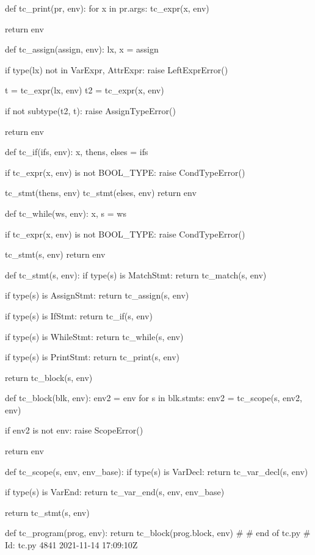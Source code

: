 \begin{dispPy}
def tc_print(pr, env):
    for x in pr.args:
        tc_expr(x, env)

    return env

def tc_assign(assign, env):
    lx, x = assign

    if type(lx) not in {VarExpr, AttrExpr}:
        raise LeftExprError()

    t = tc_expr(lx, env)
    t2 = tc_expr(x, env)

    if not subtype(t2, t):
        raise AssignTypeError()

    return env

def tc_if(ifs, env):
    x, thens, elses = ifs

    if tc_expr(x, env) is not BOOL_TYPE:
        raise CondTypeError()

    tc_stmt(thens, env)
    tc_stmt(elses, env)
    return env

def tc_while(ws, env):
    x, s = ws

    if tc_expr(x, env) is not BOOL_TYPE:
        raise CondTypeError()

    tc_stmt(s, env)
    return env

def tc_stmt(s, env):
    if type(s) is MatchStmt:
        return tc_match(s, env)

    if type(s) is AssignStmt:
        return tc_assign(s, env)

    if type(s) is IfStmt:
        return tc_if(s, env)

    if type(s) is WhileStmt:
        return tc_while(s, env)

    if type(s) is PrintStmt:
        return tc_print(s, env)

    return tc_block(s, env)

def tc_block(blk, env):
    env2 = env
    for s in blk.stmts:
        env2 = tc_scope(s, env2, env)

    if env2 is not env:
        raise ScopeError()

    return env

def tc_scope(s, env, env_base):
    if type(s) is VarDecl:
        return tc_var_decl(s, env)

    if type(s) is VarEnd:
        return tc_var_end(s, env, env_base)

    return tc_stmt(s, env)

def tc_program(prog, env):
    return tc_block(prog.block, env)
#
# end of tc.py
# Id: tc.py 4841 2021-11-14 17:09:10Z 
\end{dispPy}

